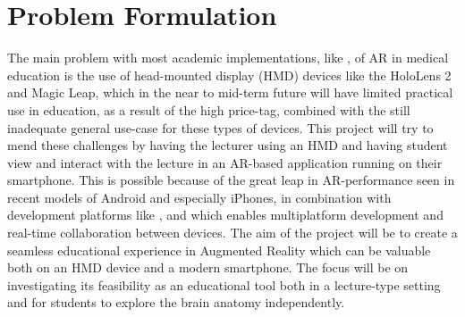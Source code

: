 


\section{Problem Formulation}


The main problem with most academic implementations, like \citep{Wish2020}, of AR in medical education is the use of head-mounted display (HMD) devices like the HoloLens 2 and Magic Leap, which in the near to mid-term future will have limited practical use in education, as a result of the high price-tag, combined with the still inadequate general use-case for these types of devices.
This project will try to mend these challenges by having the lecturer using an HMD and having student view and interact with the lecture in an AR-based application running on their smartphone. 
This is possible because of the great leap in AR-performance seen in recent models of Android and especially iPhones, in combination with development platforms like ,  and  which enables multiplatform development and real-time collaboration between devices. 
The aim of the project will be to create a seamless educational experience in Augmented Reality which can be valuable both on an HMD device and a modern smartphone. The focus will be on investigating its feasibility as an educational tool both in a lecture-type setting and for students to explore the brain anatomy independently. 


